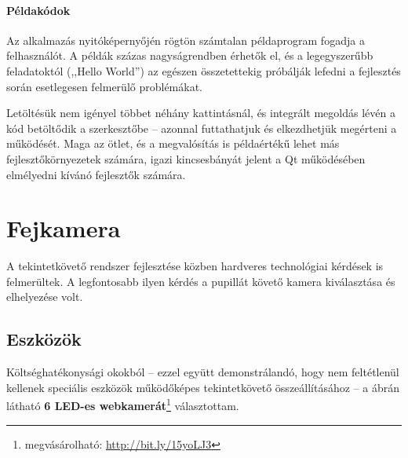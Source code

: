 \paragraph{Példakódok}

Az alkalmazás nyitóképernyőjén rögtön számtalan példaprogram fogadja a felhasználót. A példák százas nagyságrendben érhetők el, és a legegyszerűbb feladatoktól (,,Hello World'') az egészen összetettekig próbálják lefedni a fejlesztés során esetlegesen felmerülő problémákat.

Letöltésük nem igényel többet néhány kattintásnál, és integrált megoldás lévén a kód betöltődik a szerkesztőbe -- azonnal futtathatjuk és elkezdhetjük megérteni a működését. Maga az ötlet, és a megvalósítás is példaértékű lehet más fejlesztőkörnyezetek számára, igazi kincsesbányát jelent a Qt működésében elmélyedni kívánó fejlesztők számára.

\section{Fejkamera}\label{sect:infracam}

A tekintetkövető rendszer fejlesztése közben hardveres technológiai kérdések is felmerültek. A legfontosabb ilyen kérdés a pupillát követő kamera kiválasztása és elhelyezése volt.

\subsection{Eszközök}\label{sect:infracam_eszkozok}

Költséghatékonysági okokból -- ezzel együtt demonstrálandó, hogy nem feltétlenül kellenek speciális eszközök működőképes tekintetkövető összeállításához -- a  ábrán látható \textbf{6 LED-es webkamerát}\footnote{megvásárolható: \url{http://bit.ly/15yoLJ3}} választottam.

